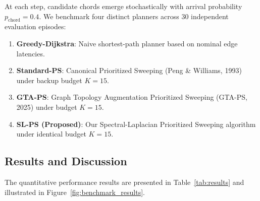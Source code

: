 \documentclass[11pt,a4paper]{article}
\begin{document}
At each step, candidate chords emerge stochastically with arrival probability $p_{\text{chord}} = 0.4$. We benchmark four distinct planners across 30 independent evaluation episodes:
\begin{enumerate}
    \item \textbf{Greedy-Dijkstra}: Naive shortest-path planner based on nominal edge latencies.
    \item \textbf{Standard-PS}: Canonical Prioritized Sweeping (Peng \& Williams, 1993) under backup budget $K = 15$.
    \item \textbf{GTA-PS}: Graph Topology Augmentation Prioritized Sweeping (GTA-PS, 2025) under budget $K = 15$.
    \item \textbf{SL-PS (Proposed)}: Our Spectral-Laplacian Prioritized Sweeping algorithm under identical budget $K = 15$.
\end{enumerate}

\subsection{Results and Discussion}

The quantitative performance results are presented in Table~\ref{tab:results} and illustrated in Figure~\ref{fig:benchmark_results}.

\begin{table}[t]
\centering
\caption{Benchmark results on dynamic congested grids (30 evaluation episodes per configuration, backup budget $K=15$).}
\label{tab:results}
\end{table}
\end{document}
